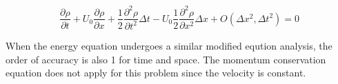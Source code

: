 \documentclass{mc2015}
\begin{document}
    \begin{equation}
    	\label{eq:MEA_p1}
    	 \frac{\partial \rho}{\partial t}  +  U_{0} \frac{\partial \rho}{\partial x} + 
    	 \frac{1}{2} \frac{\partial^2 \rho}{\partial t^2} \Delta t -
    	   U_{0}  \frac{1}{2} \frac{\partial^2 \rho}{\partial x^2} \Delta x  
    	   + O(\Delta x^{2},\Delta t^{2}) = 0 
    \end{equation} 
    
    When the energy equation undergoes a similar modified eqution analysis, the
    order of accuracy is also 1 for time and space. The momentum conservation
    equation does not apply for this problem since the velocity is
    constant.
    
%    
%    
%    
%    
\end{document}
